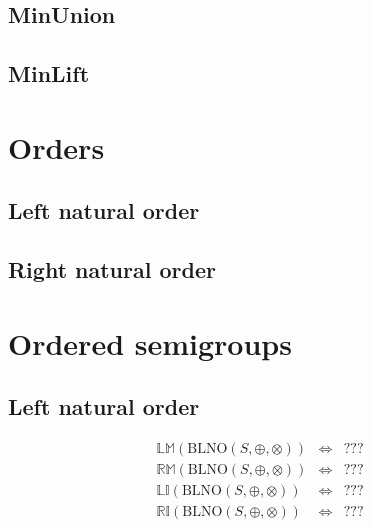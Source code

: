 \documentclass[10pt]{report}
\newcommand{\propname}[1]{{\mathbb{#1}}}
\begin{document}
\subsection{MinUnion} 




\subsection{MinLift} 






\section{Orders}

\subsection{Left natural order}



\subsection{Right natural order}




\section{Ordered semigroups}

\subsection{Left natural order}

\[
\begin{array}{rcl} 
\propname{LM}(\mathrm{BLNO}(S,\oplus,\otimes))
    & \Leftrightarrow %
    & ??? \\
\propname{RM}(\mathrm{BLNO}(S,\oplus,\otimes))
    & \Leftrightarrow %
    & ??? \\
\propname{LI}(\mathrm{BLNO}(S,\oplus,\otimes))
    & \Leftrightarrow %
    & ??? \\ 
\propname{RI}(\mathrm{BLNO}(S,\oplus,\otimes))
    & \Leftrightarrow %
    & ??? \\
\end{array} 
\] 
\end{document}
